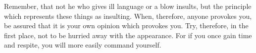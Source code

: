 Remember, that not he who gives ill language or a blow insults,
but the principle which represents these things as insulting. When,
therefore, anyone provokes you, be assured that it is your own opinion
which provokes you. Try, therefore, in the first place, not to be
hurried away with the appearance. For if you once gain time and respite,
you will more easily command yourself. 
